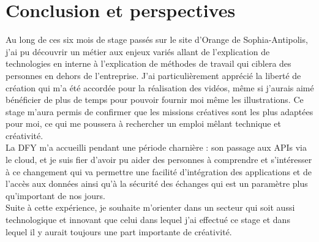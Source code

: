 \chapter*{Conclusion et perspectives}
\label{sec:conclusion}

Au long de ces six mois de stage passés sur le site d'Orange de Sophia-Antipolis, j'ai pu découvrir un métier aux enjeux variés allant de l'explication de technologies en interne à 
l'explication de méthodes de travail qui ciblera des personnes en dehors de l'entreprise. 
J'ai particulièrement apprécié la liberté de création qui m'a été accordée pour la réalisation des vidéos, même si j'aurais aimé bénéficier de plus de temps pour pouvoir fournir moi même les illustrations. Ce stage m'aura permis de confirmer que les missions créatives sont les plus adaptées pour moi, ce qui me poussera à rechercher un emploi mêlant technique et créativité.\\

La DFY m’a accueilli pendant une période charnière : son passage aux APIs via le cloud, et je suis fier d’avoir pu aider des personnes à comprendre et s'intéresser à ce changement qui va permettre une facilité d'intégration des applications et de l'accès aux données ainsi qu'à la sécurité des échanges qui est un paramètre plus qu'important de nos jours.\\

Suite à cette expérience, je souhaite m'orienter dans un secteur qui soit aussi technologique et innovant que celui dans lequel j'ai effectué ce stage et dans lequel il y aurait toujours une part importante de créativité.


